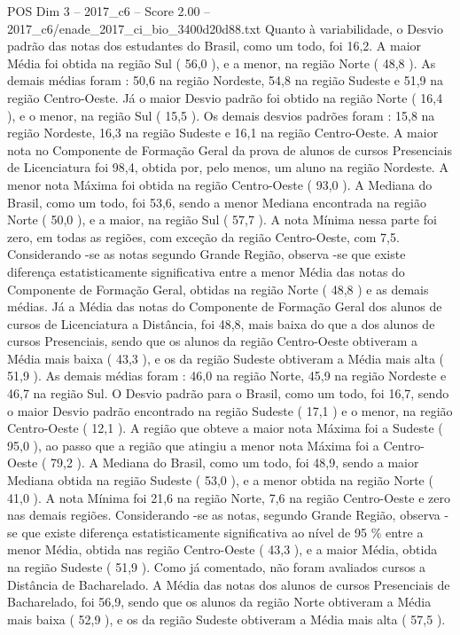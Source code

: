 \begin{textsample}{POS Dim 3 – 2017\_c6 – Score 2.00 – 2017\_c6/enade\_2017\_ci\_bio\_3400d20d88.txt}
Quanto à variabilidade, o Desvio padrão das notas dos estudantes do Brasil, como um todo, foi 16,2.
A maior Média foi obtida na região Sul ( 56,0 ), e a menor, na região Norte ( 48,8 ).
As demais médias foram : 50,6 na região Nordeste, 54,8 na região Sudeste e 51,9 na região Centro-Oeste.
Já o maior Desvio padrão foi obtido na região Norte ( 16,4 ), e o menor, na região Sul ( 15,5 ).
Os demais desvios padrões foram : 15,8 na região Nordeste, 16,3 na região Sudeste e 16,1 na região Centro-Oeste.
A maior nota no Componente de Formação Geral da prova de alunos de cursos Presenciais de Licenciatura foi 98,4, obtida por, pelo menos, um aluno na região Nordeste.
A menor nota Máxima foi obtida na região Centro-Oeste ( 93,0 ).
A Mediana do Brasil, como um todo, foi 53,6, sendo a menor Mediana encontrada na região Norte ( 50,0 ), e a maior, na região Sul ( 57,7 ).
A nota Mínima nessa parte foi zero, em todas as regiões, com exceção da região Centro-Oeste, com 7,5.
Considerando -se as notas segundo Grande Região, observa -se que existe diferença estatisticamente significativa entre a menor Média das notas do Componente de Formação Geral, obtidas na região Norte ( 48,8 ) e as demais médias.
Já a Média das notas do Componente de Formação Geral dos alunos de cursos de Licenciatura a Distância, foi 48,8, mais baixa do que a dos alunos de cursos Presenciais, sendo que os alunos da região Centro-Oeste obtiveram a Média mais baixa ( 43,3 ), e os da região Sudeste obtiveram a Média mais alta ( 51,9 ).
As demais médias foram : 46,0 na região Norte, 45,9 na região Nordeste e 46,7 na região Sul.
O Desvio padrão para o Brasil, como um todo, foi 16,7, sendo o maior Desvio padrão encontrado na região Sudeste ( 17,1 ) e o menor, na região Centro-Oeste ( 12,1 ).
A região que obteve a maior nota Máxima foi a Sudeste ( 95,0 ), ao passo que a região que atingiu a menor nota Máxima foi a Centro-Oeste ( 79,2 ).
A Mediana do Brasil, como um todo, foi 48,9, sendo a maior Mediana obtida na região Sudeste ( 53,0 ), e a menor obtida na região Norte ( 41,0 ).
A nota Mínima foi 21,6 na região Norte, 7,6 na região Centro-Oeste e zero nas demais regiões.
Considerando -se as notas, segundo Grande Região, observa -se que existe diferença estatisticamente significativa ao nível de 95 \% entre a menor Média, obtida nas região Centro-Oeste ( 43,3 ), e a maior Média, obtida na região Sudeste ( 51,9 ).
Como já comentado, não foram avaliados cursos a Distância de Bacharelado.
A Média das notas dos alunos de cursos Presenciais de Bacharelado, foi 56,9, sendo que os alunos da região Norte obtiveram a Média mais baixa ( 52,9 ), e os da região Sudeste obtiveram a Média mais alta ( 57,5 ).

\end{textsample}

